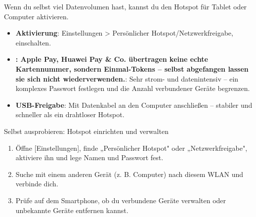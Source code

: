 
Wenn du selbst viel Datenvolumen hast, kannst du den Hotspot für Tablet oder Computer aktivieren.

\begin{itemize}
  \item \textbf{Aktivierung}: Einstellungen > Persönlicher Hotspot/Netzwerkfreigabe, einschalten.
  \item \textbf{: Apple Pay, Huawei Pay \& Co. übertragen keine echte Kartennummer, sondern Einmal-Tokens – selbst abgefangen lassen sie sich nicht wiederverwenden.}: Sehr strom- und datenintensiv – ein komplexes Passwort festlegen und die Anzahl verbundener Geräte begrenzen.
  \item \textbf{USB-Freigabe}: Mit Datenkabel an den Computer anschließen – stabiler und schneller als ein drahtloser Hotspot.
\end{itemize}

\begin{tcbpractice}{Selbst ausprobieren: Hotspot einrichten und verwalten}
\begin{enumerate}
  \item Öffne [Einstellungen], finde „Persönlicher Hotspot" oder „Netzwerkfreigabe", aktiviere ihn und lege Namen und Passwort fest.
  \item Suche mit einem anderen Gerät (z. B. Computer) nach diesem WLAN und verbinde dich.
  \item Prüfe auf dem Smartphone, ob du verbundene Geräte verwalten oder unbekannte Geräte entfernen kannst.
\end{enumerate}

\end{tcbpractice}

